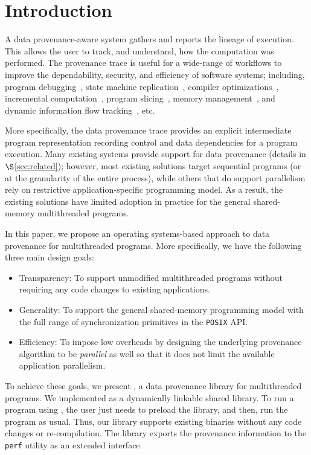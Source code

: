 \section{Introduction}
\label{sec:introduction}

A data provenance-aware system gathers and reports the lineage of execution. This allows the user to track, and understand, how the computation was performed.  The provenance trace is useful for a wide-range of workflows to improve the dependability, security, and efficiency of software systems; including, program debugging~\cite{fast-track-pldi}, state machine replication~\cite{rex},  compiler optimizations~\cite{pgo}, incremental computation~\cite{ithreads}, program slicing~\cite{roly}, memory management~\cite{memprof}, and dynamic information flow tracking~\cite{dift}, etc.


More specifically, the data provenance trace provides an explicit intermediate program representation recording control and data dependencies for a program execution. 
Many existing systems provide support for data provenance (details in $\S$\ref{sec:related}); however,
most existing solutions target sequential programs (or at the granularity of the entire process), while others that do support parallelism rely on restrictive application-specific programming model. As a result, the existing solutions have limited adoption in practice for the general shared-memory multithreaded programs.



In this paper, we propose an operating systems-based approach to data provenance for multithreaded programs. More specifically, we have the following three main design goals: 
\begin{itemize} 

\item Transparency: To support unmodified multithreaded programs without requiring any code changes to existing applications. 
\item Generality: To support the general shared-memory programming model with the  full range of synchronization primitives in the {\tt POSIX} API. 
\item Efficiency: To impose low overheads by designing the underlying provenance algorithm to be  {\em parallel} as well so that it does not limit the available application parallelism.

\end{itemize}

To achieve these goals, we present \projecttitle, a data provenance library for multithreaded programs. We implemented \projecttitle as a dynamically linkable shared library. To run a program using \projecttitle,  the user just needs to preload the \projecttitle library, and then, run the program as usual. Thus, our library supports existing binaries without any code changes or re-compilation. The library exports the provenance information to the {\tt perf} utility as an extended interface.




